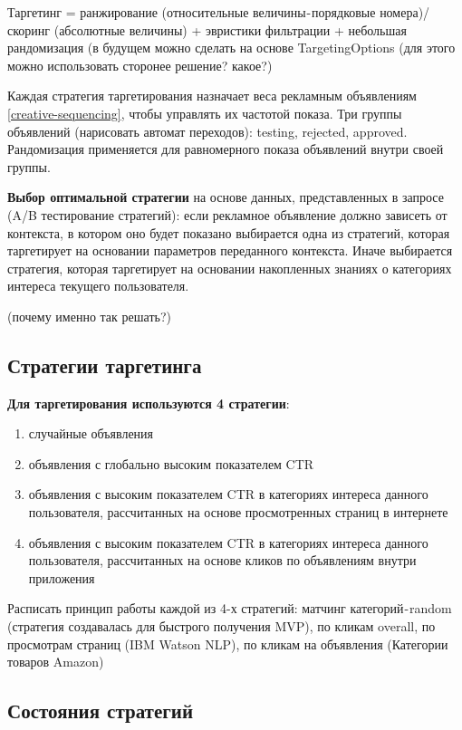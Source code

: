 \documentclass[times]{itmo-student-thesis}
\begin{document}
Таргетинг = ранжирование (относительные величины - порядковые номера)/ скоринг (абсолютные величины) + эвристики фильтрации + небольшая рандомизация (в будущем можно сделать на основе TargetingOptions (для этого можно использовать сторонее решение? какое?)

Каждая стратегия таргетирования назначает веса рекламным объявлениям \ref{creative-sequencing}, чтобы управлять их частотой показа. Три группы объявлений (нарисовать автомат переходов): testing, rejected, approved. Рандомизация применяется для равномерного показа объявлений внутри своей группы. 

\textbf{Выбор оптимальной стратегии} на основе данных, представленных в запросе (A/B тестирование стратегий): если рекламное объявление должно зависеть от контекста, в котором оно будет показано выбирается одна из стратегий, которая таргетирует на основании параметров переданного контекста. Иначе выбирается стратегия, которая таргетирует на основании накопленных знаниях о категориях интереса текущего пользователя.

(почему именно так решать?)

\subsection{Стратегии таргетинга}\label{sec:strategies}

\textbf{Для таргетирования используются 4 стратегии}:
\begin{enumerate}
	\item случайные объявления
	\item объявления с глобально высоким показателем CTR
	\item объявления с высоким показателем CTR в категориях интереса данного пользователя, рассчитанных на основе просмотренных страниц в интернете
	\item объявления с высоким показателем CTR в категориях интереса данного пользователя, рассчитанных на основе кликов по объявлениям внутри приложения
\end{enumerate}

Расписать принцип работы каждой из 4-х стратегий: матчинг категорий - random (стратегия создавалась для быстрого получения MVP), по кликам overall, по просмотрам страниц (IBM Watson NLP), по кликам на объявления (Категории товаров Amazon)

\subsection{Состояния стратегий}\label{sec:strategies-state}
\end{document}
